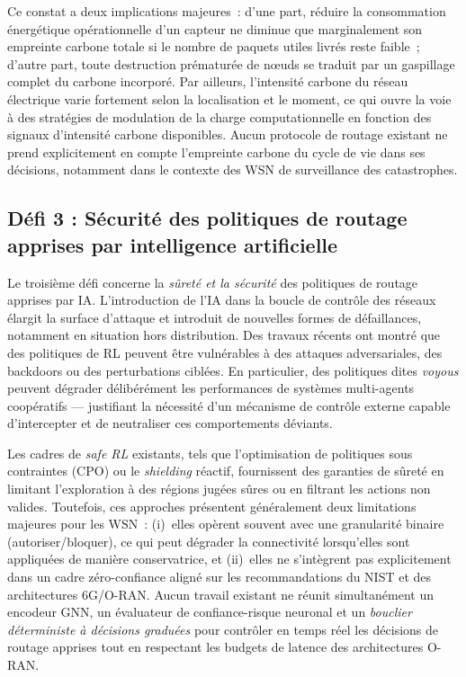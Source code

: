 Ce constat a deux implications majeures~: d'une part, réduire la consommation énergétique opérationnelle d'un capteur ne diminue que marginalement son empreinte carbone totale si le nombre de paquets utiles livrés reste faible~; d'autre part, toute destruction prématurée de nœuds se traduit par un gaspillage complet du carbone incorporé\cite{pirson2021embodied,mersy2025lca_data}. Par ailleurs, l'intensité carbone du réseau électrique varie fortement selon la localisation et le moment, ce qui ouvre la voie à des stratégies de modulation de la charge computationnelle en fonction des signaux d'intensité carbone disponibles\cite{ember2024,uk_carbon_api,carbon_signals_acm2025}. Aucun protocole de routage existant ne prend explicitement en compte l'empreinte carbone du cycle de vie dans ses décisions, notamment dans le contexte des WSN de surveillance des catastrophes\cite{freitag2021ict,aioti2024carbon,metaheuristic_wsn_slr2026}.

\subsection{Défi 3 : Sécurité des politiques de routage apprises par intelligence artificielle}

Le troisième défi concerne la \emph{sûreté et la sécurité} des politiques de routage apprises par IA. L'introduction de l'IA dans la boucle de contrôle des réseaux élargit la surface d'attaque et introduit de nouvelles formes de défaillances, notamment en situation hors distribution\cite{amodei2016concrete,garcia2015saferl,brunke2022safe}. Des travaux récents ont montré que des politiques de RL peuvent être vulnérables à des attaques adversariales, des backdoors ou des perturbations ciblées\cite{Huang2017AdvRL,Gleave2020AdvPolicies,Kiourti2021BackdoorDRL,subplay_marl2025,ami_attack_marl2024}. En particulier, des politiques dites \emph{voyous} peuvent dégrader délibérément les performances de systèmes multi-agents coopératifs --- justifiant la nécessité d'un mécanisme de contrôle externe capable d'intercepter et de neutraliser ces comportements déviants.

Les cadres de \emph{safe RL} existants, tels que l'optimisation de politiques sous contraintes (CPO) ou le \emph{shielding} réactif, fournissent des garanties de sûreté en limitant l'exploration à des régions jugées sûres ou en filtrant les actions non valides\cite{achiam2017cpo,alshiekh2018shielding,garcia2015saferl}. Toutefois, ces approches présentent généralement deux limitations majeures pour les WSN~: (i)~elles opèrent souvent avec une granularité binaire (autoriser/bloquer), ce qui peut dégrader la connectivité lorsqu'elles sont appliquées de manière conservatrice, et (ii)~elles ne s'intègrent pas explicitement dans un cadre zéro-confiance aligné sur les recommandations du NIST et des architectures 6G/O-RAN\cite{rose2020nist,polese2023oran,pranger2025shields}. Aucun travail existant ne réunit simultanément un encodeur GNN, un évaluateur de confiance-risque neuronal et un \emph{bouclier déterministe à décisions graduées} pour contrôler en temps réel les décisions de routage apprises tout en respectant les budgets de latence des architectures O-RAN\cite{corsi2024verification,dmps_shielding2024,ztaiot_acm2025}.

